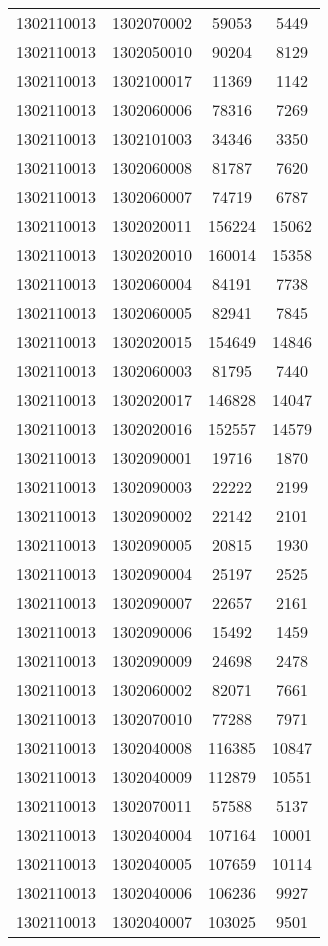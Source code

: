 \begin{longtable}{llcc}
1302110013 & 1302070002 & 59053 & 5449\\
1302110013 & 1302050010 & 90204 & 8129\\
1302110013 & 1302100017 & 11369 & 1142\\
1302110013 & 1302060006 & 78316 & 7269\\
1302110013 & 1302101003 & 34346 & 3350\\
1302110013 & 1302060008 & 81787 & 7620\\
1302110013 & 1302060007 & 74719 & 6787\\
1302110013 & 1302020011 & 156224 & 15062\\
1302110013 & 1302020010 & 160014 & 15358\\
1302110013 & 1302060004 & 84191 & 7738\\
1302110013 & 1302060005 & 82941 & 7845\\
1302110013 & 1302020015 & 154649 & 14846\\
1302110013 & 1302060003 & 81795 & 7440\\
1302110013 & 1302020017 & 146828 & 14047\\
1302110013 & 1302020016 & 152557 & 14579\\
1302110013 & 1302090001 & 19716 & 1870\\
1302110013 & 1302090003 & 22222 & 2199\\
1302110013 & 1302090002 & 22142 & 2101\\
1302110013 & 1302090005 & 20815 & 1930\\
1302110013 & 1302090004 & 25197 & 2525\\
1302110013 & 1302090007 & 22657 & 2161\\
1302110013 & 1302090006 & 15492 & 1459\\
1302110013 & 1302090009 & 24698 & 2478\\
1302110013 & 1302060002 & 82071 & 7661\\
1302110013 & 1302070010 & 77288 & 7971\\
1302110013 & 1302040008 & 116385 & 10847\\
1302110013 & 1302040009 & 112879 & 10551\\
1302110013 & 1302070011 & 57588 & 5137\\
1302110013 & 1302040004 & 107164 & 10001\\
1302110013 & 1302040005 & 107659 & 10114\\
1302110013 & 1302040006 & 106236 & 9927\\
1302110013 & 1302040007 & 103025 & 9501\\

\end{longtable}
